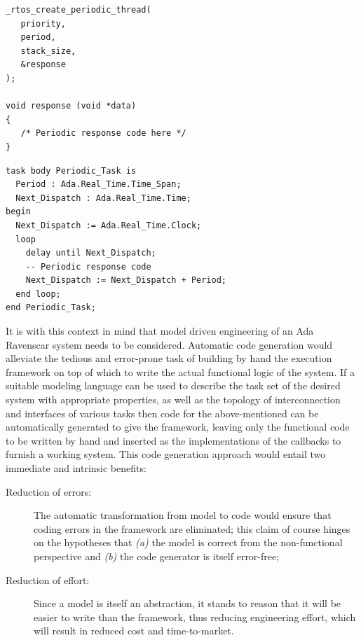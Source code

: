 \begin{minipage}{0.40\linewidth}
\lstset{language=c}
\begin{lstlisting}[label=lst:api_thread, caption = RTOS periodic thread]
_rtos_create_periodic_thread(
   priority, 
   period,
   stack_size, 
   &response
);

void response (void *data)
{
   /* Periodic response code here */
}
\end{lstlisting}
\end{minipage}
\hspace{8mm}
\begin{minipage}{0.50\linewidth}
\lstset{language=ada}
\begin{lstlisting}[label=lst:ada_task, caption=An Ada Ravenscar
    periodic task.]
task body Periodic_Task is
  Period : Ada.Real_Time.Time_Span;
  Next_Dispatch : Ada.Real_Time.Time;
begin
  Next_Dispatch := Ada.Real_Time.Clock;
  loop
    delay until Next_Dispatch;
    -- Periodic response code
    Next_Dispatch := Next_Dispatch + Period;
  end loop;
end Periodic_Task;
\end{lstlisting}
\end{minipage}

It is with this context in mind that model driven engineering of an
Ada Ravenscar system needs to be considered. Automatic code generation
would alleviate the tedious and error-prone task of building by hand
the execution framework on top of which to write the actual functional
logic of the system. If a suitable modeling language can be used to
describe the task set of the desired system with appropriate
properties, as well as the topology of interconnection and interfaces
of various tasks then code for the above-mentioned can be
automatically generated to give the framework, leaving only the
functional code to be written by hand and inserted as the
implementations of the callbacks to furnish a working system. This
code generation approach would entail two immediate and intrinsic
benefits:

\begin{description}
\item[Reduction of errors:]{The automatic transformation from model to
  code would ensure that coding errors in the framework are
  eliminated; this claim of course hinges on the hypotheses that
  \emph{(a)} the model is correct from the non-functional perspective
  and \emph{(b)} the code generator is itself error-free;}
\item[Reduction of effort:]{Since a model is itself an abstraction, it
  stands to reason that it will be easier to write than the framework,
  thus reducing engineering effort, which will result in reduced cost
  and time-to-market.}
\end{description}

